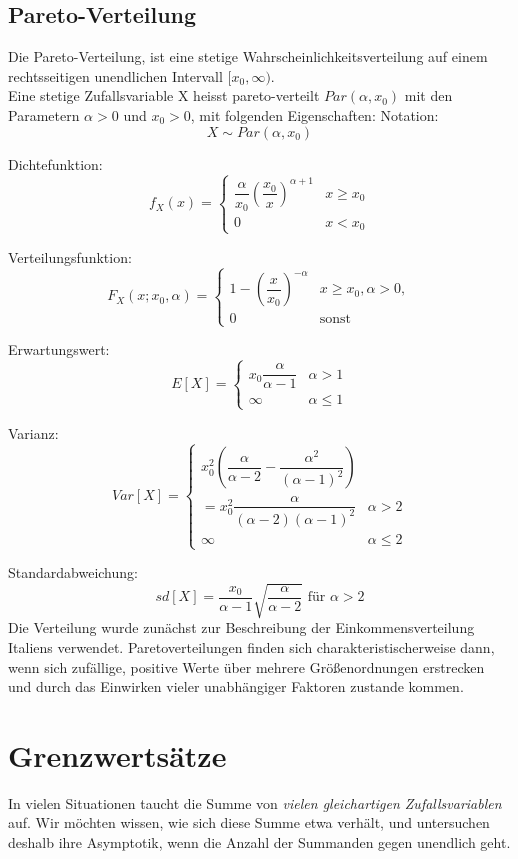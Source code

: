 \documentclass[10pt,a4paper,twocolumn]{article}
\begin{document}
\subsection{Pareto-Verteilung}
Die Pareto-Verteilung, ist eine stetige Wahrscheinlichkeitsverteilung auf einem rechtsseitigen unendlichen Intervall $[x_0, \infty)$.\\
Eine stetige Zufallsvariable X heisst pareto-verteilt $Par(\alpha, x_0)$ mit den Parametern $\alpha > 0$ und $x_0 > 0$, mit folgenden Eigenschaften:
Notation:
\[
X \sim Par(\alpha, x_0)
\]

Dichtefunktion:
\[
f_X(x) =\begin{cases}
			\dfrac{\alpha}{x_0}\left(\dfrac{x_0}{x}\right)^{\alpha + 1} & x \geq x_0\\
			0 & x < x_0
		\end{cases}
\]

Verteilungsfunktion:
\[
F_X(x; x_0, \alpha) = \begin{cases}
			1 - \left(\dfrac{x}{x_0}\right)^{-\alpha} & x \geq x_0, \alpha > 0,\\
			0 & \text{sonst}
		\end{cases}
\]

Erwartungswert:
\[
E[X] = \begin{cases}
			x_0\dfrac{\alpha}{\alpha - 1} & \alpha > 1\\
			\infty & \alpha \leq 1
		\end{cases}
\]

Varianz:
\[
Var[X] = \begin{cases}
			x_0^2 \left(\dfrac{\alpha}{\alpha - 2} - \dfrac{\alpha^2}{(\alpha - 1)^2}\right)\\
			= x_0^2 \dfrac{\alpha}{(\alpha - 2)(\alpha - 1)^2} & \alpha > 2\\
			\infty & \alpha \leq 2
		\end{cases}
\]

Standardabweichung:
\[
sd[X]=\dfrac{x_0}{\alpha - 1}\sqrt{\dfrac{\alpha}{\alpha - 2}} \text{ für } \alpha > 2
\]
Die Verteilung wurde zunächst zur Beschreibung der Einkommensverteilung Italiens verwendet. Paretoverteilungen finden sich charakteristischerweise dann, wenn sich zufällige, positive Werte über mehrere Größenordnungen erstrecken und durch das Einwirken vieler unabhängiger Faktoren zustande kommen.

\section{Grenzwertsätze}
In vielen Situationen taucht die Summe von \emph{vielen gleichartigen Zufallsvariablen} auf. Wir möchten wissen, wie sich diese Summe etwa verhält, und untersuchen deshalb ihre Asymptotik, wenn die Anzahl der Summanden gegen unendlich geht.
\end{document}

